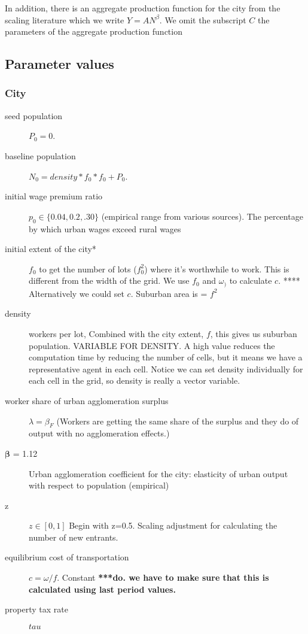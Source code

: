 In addition, there is an aggregate production function for the city from the scaling literature which we write $Y=AN^\beta$. We omit the subscript $C$  the parameters of the aggregate production function

\subsection{Parameter values}\label{sec-param-values}

\subsubsection{City}
\begin{description}

\item [seed population] $P_0=0$. %

\item [baseline population] $N_0=density * f_0 * f_0 + P_0$.
\item  [initial wage premium ratio] $p_0\in\{0.04,0.2,.30\}$ (empirical range from various sources). The percentage by which urban wages exceed rural wages 
\item  [initial extent of the city*] $f_0$ to get the number of lots ($f_0^2$) where it's worthwhile to work. This is different from the width of the grid. We use $f_0$ and $\omega_)$ to calculate $c$. **** Alternatively we could set  $c$. Suburban area is  = $f^2$ 
\item  [density]  workers per lot, Combined with the city extent, $f$, this gives us suburban population. VARIABLE FOR DENSITY. A high value reduces the computation time by reducing the number of cells, but it means we have a representative agent in  each cell. Notice we can set density individually for each cell in the grid, so density is really a vector variable.%
\item [worker share of urban agglomeration surplus] $\lambda=\beta_F$ (Workers are getting the same share of the surplus and they do of output with no agglomeration effects.)
\item  [$\mathbf{\beta}$ = 1.12] Urban agglomeration coefficient for the city: elasticity of urban output with respect to population (empirical)
\item [z] $z\in[0,1]$ Begin with z=0.5. Scaling adjustment for calculating the number of new entrants. 
\item [equilibrium cost of transportation] $c = \omega/f$. Constant
\textbf{***do. we have to make sure that this is calculated using last period values.}

\item[property tax rate] $tau$
\end{description}


